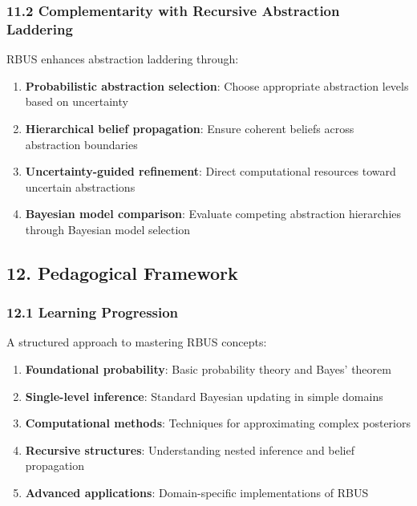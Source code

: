 \documentclass[
]{article}
\providecommand{\tightlist}{%
  \setlength{\itemsep}{0pt}\setlength{\parskip}{0pt}}
\begin{document}
\subsubsection{11.2 Complementarity with Recursive Abstraction
Laddering}\label{complementarity-with-recursive-abstraction-laddering}

RBUS enhances abstraction laddering through:

\begin{enumerate}
\def\labelenumi{\arabic{enumi}.}
\tightlist
\item
  \textbf{Probabilistic abstraction selection}: Choose appropriate
  abstraction levels based on uncertainty
\item
  \textbf{Hierarchical belief propagation}: Ensure coherent beliefs
  across abstraction boundaries
\item
  \textbf{Uncertainty-guided refinement}: Direct computational resources
  toward uncertain abstractions
\item
  \textbf{Bayesian model comparison}: Evaluate competing abstraction
  hierarchies through Bayesian model selection
\end{enumerate}

\subsection{12. Pedagogical Framework}\label{pedagogical-framework}

\subsubsection{12.1 Learning Progression}\label{learning-progression}

A structured approach to mastering RBUS concepts:

\begin{enumerate}
\def\labelenumi{\arabic{enumi}.}
\tightlist
\item
  \textbf{Foundational probability}: Basic probability theory and Bayes'
  theorem
\item
  \textbf{Single-level inference}: Standard Bayesian updating in simple
  domains
\item
  \textbf{Computational methods}: Techniques for approximating complex
  posteriors
\item
  \textbf{Recursive structures}: Understanding nested inference and
  belief propagation
\item
  \textbf{Advanced applications}: Domain-specific implementations of
  RBUS
\end{enumerate}
\end{document}
